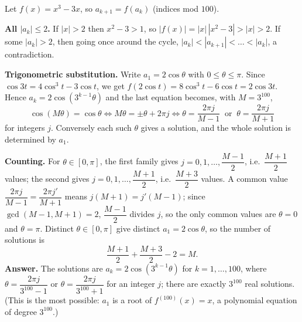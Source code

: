 Let $f(x)=x^3-3x$, so $a_{k+1}=f(a_k)$ (indices mod $100$).

\textbf{All $|a_k|\le2$.} If $|x|>2$ then $x^2-3>1$, so $|f(x)|=|x|\,|x^2-3|>|x|>2$. If some $|a_k|>2$, then going once around the cycle, $|a_k|<|a_{k+1}|<\dots<|a_k|$, a contradiction.

\textbf{Trigonometric substitution.} Write $a_1=2\cos\theta$ with $0\le\theta\le\pi$. Since $\cos3t=4\cos^3t-3\cos t$, we get $f(2\cos t)=8\cos^3t-6\cos t=2\cos3t$. Hence $a_k=2\cos(3^{k-1}\theta)$ and the last equation becomes, with $M=3^{100}$,
\[
\cos(M\theta)=\cos\theta\iff M\theta=\pm\theta+2\pi j\iff \theta=\dfrac{2\pi j}{M-1}\ \text{ or }\ \theta=\dfrac{2\pi j}{M+1}
\]
for integers $j$. Conversely each such $\theta$ gives a solution, and the whole solution is determined by $a_1$.

\textbf{Counting.} For $\theta\in[0,\pi]$, the first family gives $j=0,1,\dots,\dfrac{M-1}{2}$, i.e.\ $\dfrac{M+1}{2}$ values; the second gives $j=0,1,\dots,\dfrac{M+1}{2}$, i.e.\ $\dfrac{M+3}{2}$ values. A common value $\dfrac{2\pi j}{M-1}=\dfrac{2\pi j'}{M+1}$ means $j(M+1)=j'(M-1)$; since $\gcd(M-1,M+1)=2$, $\dfrac{M-1}{2}$ divides $j$, so the only common values are $\theta=0$ and $\theta=\pi$. Distinct $\theta\in[0,\pi]$ give distinct $a_1=2\cos\theta$, so the number of solutions is
\[
\dfrac{M+1}{2}+\dfrac{M+3}{2}-2=M .
\]
\textbf{Answer.} The solutions are $a_k=2\cos(3^{k-1}\theta)$ for $k=1,\dots,100$, where $\theta=\dfrac{2\pi j}{3^{100}-1}$ or $\theta=\dfrac{2\pi j}{3^{100}+1}$ for an integer $j$; there are exactly $\boxed{3^{100}}$ real solutions. (This is the most possible: $a_1$ is a root of $f^{(100)}(x)=x$, a polynomial equation of degree $3^{100}$.)
